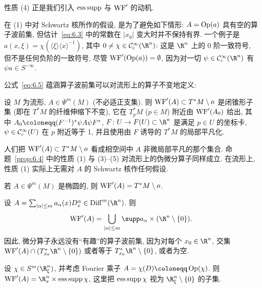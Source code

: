 性质 (4) 正是我们引入 $\operatorname{ess\,supp}$ 与 $\operatorname{WF}'$ 的动机.

\begin{remark}[空的算子波前集]\label{rem:6.5}
在 (1) 中对 Schwartz 核所作的假设, 是为了避免如下情形: $A = \operatorname{Op}(a)$ 具有空的算子波前集, 但估计~\eqref{eq:6.3} 中的常数在 $|x_0|$ 变大时并不保持有界. 一个例子是 $a(x, \xi) = \chi(\langle \xi \rangle \langle x \rangle^{-1})$, 其中 $0 \neq \chi \in \SmoothComp(\R^n)$: 这是 $\R^n$ 上的 0 阶一致符号, 但不是任何负阶的一致符号, 尽管 $\operatorname{WF}'(\operatorname{Op}(a)) = \emptyset$, 因为对一切 $\psi \in \SmoothComp(\R^n)$ 有 $\psi a \in S^{-\infty}$.
\end{remark}

公式~\eqref{eq:6.5} 蕴涵算子波前集可以对流形上的算子不变地定义:

\begin{definition}\label{def:6.6}
设 $M$ 为流形, $A \in \Psi^m(M)$ (不必适正支集). 则 $\operatorname{WF}'(A) \subset T^* M \setminus o$ 是闭锥形子集 (即在 $T^* M$ 的纤维伸缩下不变), 它在 $T^*_p M$ ($p \in M$) 附近由 $\operatorname{WF}'(A_0)$ 给出, 其中 $A_0 \defeq (F^{-1})^* \psi A \psi F^*$, $F \colon U \to F(U) \subset \R^n$ 是满足 $p \in U$ 的坐标卡, $\psi \in \mathcal{C}_{\mathrm{c}}^\infty(U)$ 在 $p$ 附近等于 1, 并且使用由 $F$ 诱导的 $T^* M$ 的局部平凡化.
\end{definition}

人们把 $\operatorname{WF}'(A) \subset T^* M \setminus o$ 看成相空间中 $A$ 非微局部平凡的那个集合. 命题~\ref{prop:6.4} 中的性质 (1) 与 (3)--(5) 对流形上的伪微分算子同样成立. 在流形上, 性质 (1) 实际上无需对 $A$ 的 Schwartz 核作任何假设.

\begin{example}[椭圆伪微分算子]\label{eg:6.7}
若 $A \in \Psi^m(M)$ 是椭圆的, 则 $\operatorname{WF}'(A) = T^* M \setminus o$.
\end{example}

\begin{example}[微分算子]\label{eg:6.8}
设 $A = \sum_{|\alpha| \le m} a_\alpha(x) D_x^\alpha \in \Diff^m(\R^n)$. 则
\begin{equation}\label{eq:6.6}
    \WF'(A) = \bigcup_{|\alpha| \le m} \supp a_\alpha \times (\R^n \setminus \{0\}).
\end{equation}
因此, 微分算子永远没有``有趣''的算子波前集, 因为对每个 $x_0 \in \R^n$, 交集 $\WF'(A) \cap (T^*_{x_0} \R^n \setminus \{0\})$ 或者等于 $T^*_{x_0} \R^n \setminus \{0\}$, 或者为空.
\end{example}

\begin{example}[Fourier 乘子]\label{eg:6.9}
设 $\chi \in S^m(\R^n_\xi)$, 并考虑 Fourier 乘子 $A = \chi(D) \defeq \Op(\chi)$. 则 $\WF'(A) = \R^n_x \times \esupp \chi$, 这里把 $\operatorname{ess\,supp} \chi$ 视为 $\R^n_\xi \setminus \{0\}$ 的子集.
\end{example}

